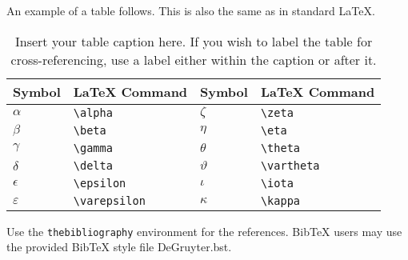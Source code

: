 \documentclass[letterpaper,12pt]{article}
\begin{document}
An example of a table follows. This is also the same as in standard LaTeX.

\begin{table}[!h]
\centering
\caption{Insert your table caption here. If you wish to label the table for
  cross-referencing, use a label either within the caption or after it.}
\begin{tabular}{llll}
\hline
Symbol        & LaTeX Command      & Symbol      & LaTeX Command \\
\hline
$\alpha$      & \verb+\alpha+      & $\zeta$     & \verb+\zeta+ \\
$\beta$       & \verb+\beta+       & $\eta$      & \verb+\eta+ \\
$\gamma$      & \verb+\gamma+      & $\theta$    & \verb+\theta+ \\
$\delta$      & \verb+\delta+      & $\vartheta$ & \verb+\vartheta+ \\
$\epsilon$    & \verb+\epsilon+    & $\iota$     & \verb+\iota+ \\
$\varepsilon$ & \verb+\varepsilon+ & $\kappa$    & \verb+\kappa+ \\
\hline
\end{tabular}
\end{table}

Use the \verb+thebibliography+ environment for the references.  BibTeX users may
use the provided BibTeX style file DeGruyter.bst.



\end{document}
